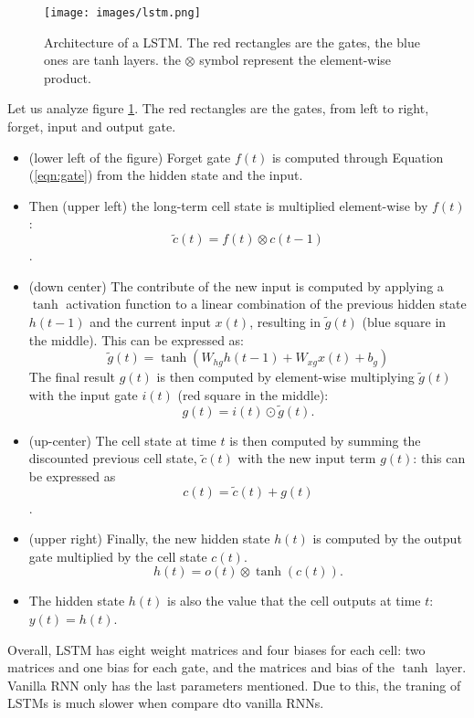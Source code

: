 \documentclass[oneside]{book}
\theoremstyle{definition}
\theoremstyle{plain}
\begin{document}
\begin{figure}
    \centering
    \texttt{[image: images/lstm.png]}
    \caption{Architecture of a LSTM. The red rectangles are the gates, the blue ones are tanh layers. the $\otimes$ symbol represent the element-wise product.}
    \label{fig:lstm}
\end{figure}
Let us analyze figure \ref{fig:lstm}. The red rectangles are the gates, from left to right, forget, input and output gate. 
\begin{itemize}
    \item (lower left of the figure) Forget gate $f(t)$ is computed through Equation (\ref{eqn:gate}) from the hidden state and the input.
    \item Then (upper left) the long-term cell state is multiplied element-wise by $f(t)$: 
    \[ \tilde c(t)= f(t) \otimes c(t-1)\].
     
    \item (down center) The contribute of the new input is computed by applying a \(\tanh\) activation function to a linear combination of the previous hidden state \(h(t-1)\) and the current input \(x(t)\), resulting in \(\tilde{g}(t)\) (blue square in the middle). This can be expressed as:
    \[
    \tilde{g}(t) = \tanh(W_{hg} h(t-1) + W_{xg} x(t) + b_g)
    \]
    The final result \(g(t)\) is then computed by element-wise multiplying \(\tilde{g}(t)\) with the input gate \(i(t)\) (red square in the middle):
    \[
    g(t) = i(t) \odot \tilde{g}(t).
    \]
   
    \item (up-center) The cell state at time $t$ is then computed by summing the discounted previous cell state, $\tilde c(t)$ with the new input term $g(t)$: this can be expressed as
    \[c(t)=\tilde c(t) + g(t)
    \] .

    \item (upper right) Finally, the new hidden state $h(t)$ is computed by the output gate multiplied by the cell state $c(t)$. 
    \[h(t)=o(t)\otimes \tanh(c(t)).\]
    \item  The hidden state $h(t)$ is also the value that the cell outputs at time $t$: $y(t)=h(t)$.
\end{itemize}

Overall, LSTM has eight weight matrices and four biases for each cell: two matrices and one bias for each gate, and the matrices and bias of the $\tanh$ layer. Vanilla RNN only has the last parameters mentioned. Due to this, the traning of LSTMs is much slower when compare dto vanilla RNNs.
\end{document}
